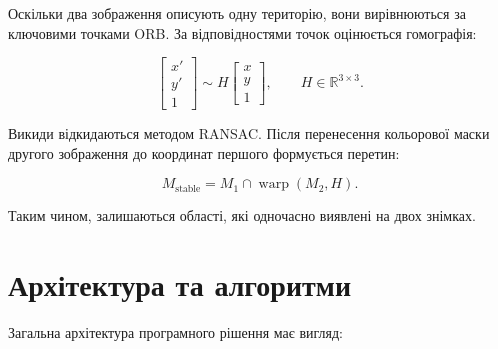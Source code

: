 \documentclass[12pt,a4paper]{article}
\begin{document}
Оскільки два зображення описують одну територію, вони вирівнюються за ключовими точками ORB. За відповідностями точок оцінюється гомографія:

\begin{equation}
  \begin{bmatrix}x'\\y'\\1\end{bmatrix}
  \sim
  H
  \begin{bmatrix}x\\y\\1\end{bmatrix},
  \qquad H\in\mathbb{R}^{3\times3}.
\end{equation}

Викиди відкидаються методом RANSAC. Після перенесення кольорової маски другого зображення до координат першого формується перетин:

\begin{equation}
  M_{\mathrm{stable}}=M_1\cap\operatorname{warp}(M_2,H).
\end{equation}

Таким чином, залишаються області, які одночасно виявлені на двох знімках.

\section{Архітектура та алгоритми}

Загальна архітектура програмного рішення має вигляд:
\end{document}
